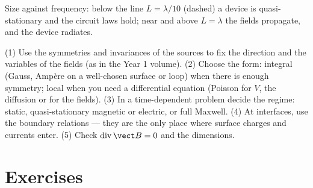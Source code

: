 \begin{omfigure}

{\small Size against frequency: below the line $L = \lambda/10$ (dashed) a
device is quasi-stationary and the circuit laws hold; near and above
$L = \lambda$ the fields propagate, and the device radiates.}
\end{omfigure}

\begin{method}\label{met:b2:maxwell-equations:method}
(1) Use the symmetries and invariances of the sources to fix the
direction and the variables of the fields (as in the Year 1 volume).
(2) Choose the form: integral (Gauss, Ampère on a well-chosen surface
or loop) when there is enough symmetry; local when you need a
differential equation (Poisson for $V$, the diffusion or 
for the fields). (3) In a time-dependent problem decide the regime:
static, quasi-stationary magnetic or electric, or full Maxwell. (4)
At interfaces, use the boundary relations --- they are the only place
where surface charges and currents enter. (5) Check
$\operatorname{div}\vect B = 0$ and the dimensions.
\end{method}

\section{Exercises}

